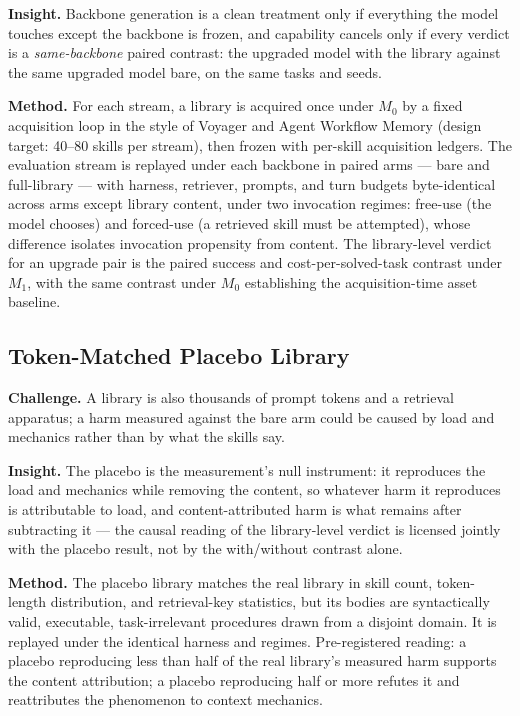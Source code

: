 \documentclass[11pt]{article}
\begin{document}
\textbf{Insight.} Backbone generation is a clean treatment only if everything the model touches except the backbone is frozen, and capability cancels only if every verdict is a \emph{same-backbone} paired contrast: the upgraded model with the library against the same upgraded model bare, on the same tasks and seeds.

\textbf{Method.} For each stream, a library is acquired once under $M_0$ by a fixed acquisition loop in the style of Voyager and Agent Workflow Memory \citep{Voyager2023,AWM2024} (design target: 40--80 skills per stream), then frozen with per-skill acquisition ledgers. The evaluation stream is replayed under each backbone in paired arms --- bare and full-library --- with harness, retriever, prompts, and turn budgets byte-identical across arms except library content, under two invocation regimes: free-use (the model chooses) and forced-use (a retrieved skill must be attempted), whose difference isolates invocation propensity from content. The library-level verdict for an upgrade pair is the paired success and cost-per-solved-task contrast under $M_1$, with the same contrast under $M_0$ establishing the acquisition-time asset baseline.

\subsection{Token-Matched Placebo Library}

\textbf{Challenge.} A library is also thousands of prompt tokens and a retrieval apparatus; a harm measured against the bare arm could be caused by load and mechanics rather than by what the skills say.

\textbf{Insight.} The placebo is the measurement's null instrument: it reproduces the load and mechanics while removing the content, so whatever harm it reproduces is attributable to load, and content-attributed harm is what remains after subtracting it --- the causal reading of the library-level verdict is licensed jointly with the placebo result, not by the with/without contrast alone.

\textbf{Method.} The placebo library matches the real library in skill count, token-length distribution, and retrieval-key statistics, but its bodies are syntactically valid, executable, task-irrelevant procedures drawn from a disjoint domain. It is replayed under the identical harness and regimes. Pre-registered reading: a placebo reproducing less than half of the real library's measured harm supports the content attribution; a placebo reproducing half or more refutes it and reattributes the phenomenon to context mechanics.
\end{document}
